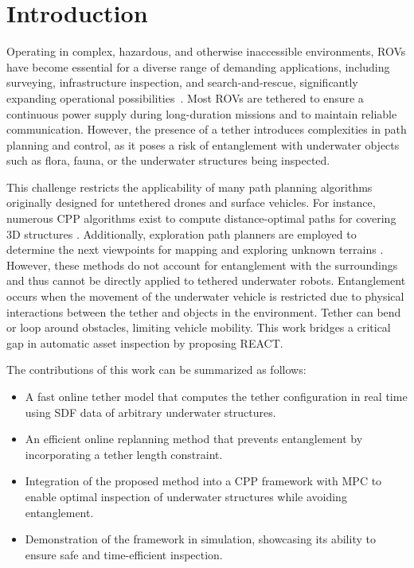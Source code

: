 \section{Introduction}
\label{sec:introduction}

%
Operating in complex, hazardous, and otherwise inaccessible environments, \Acfp{ROV} have become essential for a diverse range of demanding applications, including surveying, infrastructure inspection, and search-and-rescue, significantly expanding operational possibilities~\cite{amer2023unav, amer2025modelling}.
%
%
Most \acp{ROV} are tethered to ensure a continuous power supply during long-duration missions and to maintain reliable communication.
%
%
However, the presence of a tether introduces complexities in path planning and control, as it poses a risk of entanglement with underwater objects such as flora, fauna, or the underwater structures being inspected.

This challenge restricts the applicability of many path planning algorithms originally designed for untethered drones and surface vehicles. For instance, numerous \ac{CPP} algorithms exist to compute distance-optimal paths for covering 3D structures \cite{bircher2015structural,feng2024fc, amer2023visual}. Additionally, exploration path planners are employed to determine the next viewpoints for mapping and exploring unknown terrains \cite{dang2020graph}. However, these methods do not account for entanglement with the surroundings and thus cannot be directly applied to tethered underwater robots.
%
%
Entanglement occurs when the movement of the underwater vehicle is restricted due to physical interactions between the tether and objects in the environment. Tether can bend or loop around obstacles, limiting vehicle mobility. This work bridges a critical gap in automatic asset inspection by proposing \ac{REACT}.

The contributions of this work can be summarized as follows:
\begin{itemize}
\item A fast online tether model that computes the tether configuration in real time using \ac{SDF} data of arbitrary underwater structures.
\item An efficient online replanning method that prevents entanglement by incorporating a tether length constraint.
\item Integration of the proposed method into a \ac{CPP} framework with \ac{MPC} to enable optimal inspection of underwater structures while avoiding entanglement.

\item Demonstration of the framework in simulation, showcasing its ability to ensure safe and time-efficient inspection.
\end{itemize}


